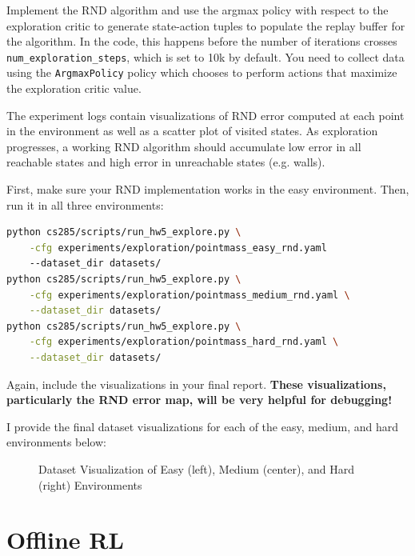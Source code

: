 \documentclass{article}
\begin{document}
Implement the RND algorithm and use the argmax policy with respect to the exploration critic to generate state-action tuples to populate the replay buffer for the algorithm. In the code, this happens before the number of iterations crosses \verb+num_exploration_steps+, which is set to 10k by default. You need to collect data using the \verb+ArgmaxPolicy+ policy which chooses to perform actions that maximize the exploration critic value.

The experiment logs contain visualizations of RND error computed at each point in the environment as well as a scatter plot of visited states. As exploration progresses, a working RND algorithm should accumulate low error in all reachable states and high error in unreachable states (e.g. walls).

First, make sure your RND implementation works in the easy environment. Then, run it in all three environments:
\begin{lstlisting}[language=bash]
python cs285/scripts/run_hw5_explore.py \
    -cfg experiments/exploration/pointmass_easy_rnd.yaml
    --dataset_dir datasets/
python cs285/scripts/run_hw5_explore.py \
    -cfg experiments/exploration/pointmass_medium_rnd.yaml \
    --dataset_dir datasets/
python cs285/scripts/run_hw5_explore.py \
    -cfg experiments/exploration/pointmass_hard_rnd.yaml \
    --dataset_dir datasets/
\end{lstlisting}

Again, include the visualizations in your final report. \textbf{These visualizations, particularly the RND error map, will be very helpful for debugging!}

\begin{sol} I provide the final dataset visualizations for each of the easy, medium, and hard environments below:
    \begin{figure}[!ht]\color{darkblue}
        \begin{center}
    \end{center}
        \caption{Dataset Visualization of Easy (left), Medium (center), and Hard (right) Environments}
    \end{figure}
    \end{sol}

\section{Offline RL}
\end{document}
